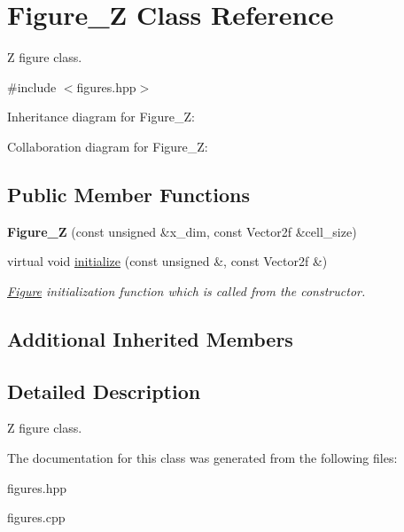 \hypertarget{classFigure__Z}{}\section{Figure\+\_\+Z Class Reference}
\label{classFigure__Z}


Z figure class.  




{\ttfamily \#include $<$figures.\+hpp$>$}



Inheritance diagram for Figure\+\_\+Z\+:


Collaboration diagram for Figure\+\_\+Z\+:
\subsection*{Public Member Functions}
\begin{DoxyCompactItemize}
\item 
\mbox{\label{classFigure__Z_a0b1ef4e2366f850966638fbcfff80d43}} 
{\bfseries Figure\+\_\+Z} (const unsigned \&x\+\_\+dim, const Vector2f \&cell\+\_\+size)
\item 
\mbox{\label{classFigure__Z_a30073e4f2071bd9e4c34aea7a499b0a1}} 
virtual void \hyperlink{classFigure__Z_a30073e4f2071bd9e4c34aea7a499b0a1}{initialize} (const unsigned \&, const Vector2f \&)
\begin{DoxyCompactList}\small\item\em \hyperlink{classFigure}{Figure} initialization function which is called from the constructor. \end{DoxyCompactList}\end{DoxyCompactItemize}
\subsection*{Additional Inherited Members}


\subsection{Detailed Description}
Z figure class. 

The documentation for this class was generated from the following files\+:\begin{DoxyCompactItemize}
\item 
figures.\+hpp\item 
figures.\+cpp\end{DoxyCompactItemize}
